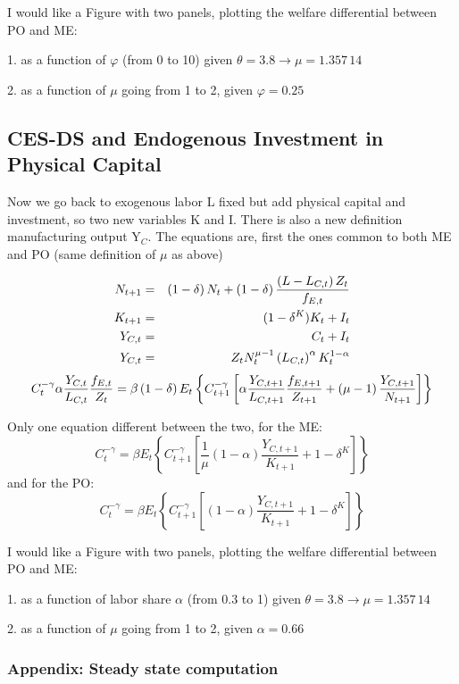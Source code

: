 \documentclass{article}
\begin{document}
I would like a Figure with two panels, plotting the welfare differential
between PO and ME:

1. as a function of $\varphi $ (from $0$ to 10) given $\theta
=3.8\rightarrow \mu =1.357\,14$

2. as a function of $\mu $ going from 1 to 2, given $\varphi =0.25$ 

\subsection{CES-DS and Endogenous Investment in Physical Capital}

Now we go back to exogenous labor L fixed but add physical capital and
investment, so two new variables K and I. There is also a new definition
manufacturing output Y$_{C}$. The equations are, first the ones common to
both ME and PO (same definition of $\mu $ as above)

\begin{eqnarray*}
N_{t+1} &=&\left( 1-\delta \right) N_{t}+\left( 1-\delta \right) \frac{%
\left( L-L_{C,t}\right) Z_{t}}{f_{E,t}} \\
K_{t+1} &=&(1-\delta ^{K})K_{t}+I_{t} \\
Y_{C,t} &=&C_{t}+I_{t} \\
Y_{C,t} &=&Z_{t}N_{t}^{\mu -1}\left( L_{C,t}\right) ^{\alpha
}K_{t}^{1-\alpha }
\end{eqnarray*}%
\[
C_{t}^{-\gamma }\alpha \frac{Y_{C,t}}{L_{C,t}}\frac{f_{E,t}}{Z_{t}}=\beta
\left( 1-\delta \right) E_{t}\left\{ C_{t+1}^{-\gamma }\left[ \alpha \frac{%
Y_{C,t+1}}{L_{C,t+1}}\frac{f_{E,t+1}}{Z_{t+1}}+\left( \mu -1\right) \frac{%
Y_{C,t+1}}{N_{t+1}}\right] \right\} 
\]

Only one equation different between the two, for the ME:%
\[
C_{t}^{-\gamma }=\beta E_{t}\left\{ C_{t+1}^{-\gamma }\left[ \frac{1}{\mu }%
\left( 1-\alpha \right) \frac{Y_{C,t+1}}{K_{t+1}}+1-\delta ^{K}\right]
\right\} 
\]%
and for the PO: 
\[
C_{t}^{-\gamma }=\beta E_{t}\left\{ C_{t+1}^{-\gamma }\left[ \left( 1-\alpha
\right) \frac{Y_{C,t+1}}{K_{t+1}}+1-\delta ^{K}\right] \right\} 
\]

I would like a Figure with two panels, plotting the welfare differential
between PO and ME:

1. as a function of labor share $\alpha $ (from $0.3$ to 1) given $\theta
=3.8\rightarrow \mu =1.357\,14$

2. as a function of $\mu $ going from 1 to 2, given $\alpha =0.66$ 

\subsubsection{Appendix: Steady state computation}
\end{document}
